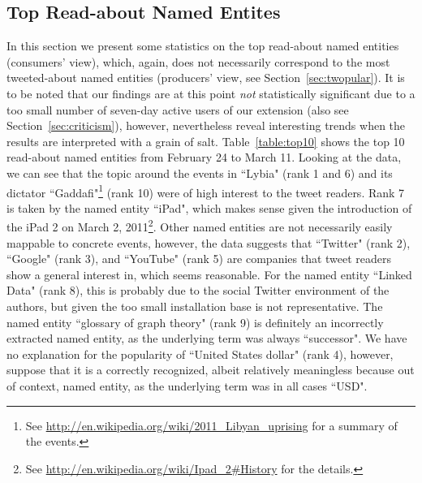\documentclass[runningheads,a4paper]{llncs}
\begin{document}
\subsection{Top Read-about Named Entites}
In this section we present some statistics on the top read-about named entities (consumers' view), which, again, does not necessarily correspond to the most tweeted-about named entities (producers' view, see Section~\ref{sec:twopular}). It is to be noted that our findings are at this point \textit{not} statistically significant due to a too small number of seven-day active users of our extension (also see Section~\ref{sec:criticism}), however, nevertheless reveal interesting trends when the results are interpreted with a grain of salt. Table~\ref{table:top10} shows the top 10 read-about named entities from February 24 to March 11. Looking at the data, we can see that the topic around the events in ``Lybia" (rank 1 and 6) and its dictator ``Gaddafi"\footnote{See \url{http://en.wikipedia.org/wiki/2011_Libyan_uprising} for a summary of the events.} (rank 10) were of high interest to the tweet readers. Rank 7 is taken by the named entity ``iPad", which makes sense given the introduction of the iPad 2 on March 2, 2011\footnote{See \url{http://en.wikipedia.org/wiki/Ipad_2#History} for the details.}. Other named entities are not necessarily easily mappable to concrete events, however, the data suggests that ``Twitter" (rank 2), ``Google" (rank 3), and ``YouTube" (rank 5) are companies that tweet readers show a general interest in, which seems reasonable. For the named entity ``Linked Data" (rank 8), this is probably due to the social Twitter environment of the authors, but given the too small installation base is not representative. The named entity ``glossary of graph theory" (rank 9) is definitely an incorrectly extracted named entity, as the underlying term was always ``successor". We have no explanation for the popularity of ``United States dollar" (rank 4), however, suppose that it is a correctly recognized, albeit relatively meaningless because out of context, named entity, as the underlying term was in all cases ``USD".
\end{document}
